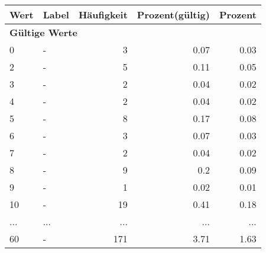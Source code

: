      \begin{longtable}{lXrrr}
     \toprule
     \textbf{Wert} & \textbf{Label} & \textbf{Häufigkeit} & \textbf{Prozent(gültig)} & \textbf{Prozent} \\
     \endhead
     \midrule
     \multicolumn{5}{l}{\textbf{Gültige Werte}}\\
        0 & \multicolumn{1}{X}{-} & %
          \num{3} &
          \num[round-mode=places,round-precision=2]{0,07} &
          \num[round-mode=places,round-precision=2]{0,03} \\
        2 & \multicolumn{1}{X}{-} & %
          \num{5} &
          \num[round-mode=places,round-precision=2]{0,11} &
          \num[round-mode=places,round-precision=2]{0,05} \\
        3 & \multicolumn{1}{X}{-} & %
          \num{2} &
          \num[round-mode=places,round-precision=2]{0,04} &
          \num[round-mode=places,round-precision=2]{0,02} \\
        4 & \multicolumn{1}{X}{-} & %
          \num{2} &
          \num[round-mode=places,round-precision=2]{0,04} &
          \num[round-mode=places,round-precision=2]{0,02} \\
        5 & \multicolumn{1}{X}{-} & %
          \num{8} &
          \num[round-mode=places,round-precision=2]{0,17} &
          \num[round-mode=places,round-precision=2]{0,08} \\
        6 & \multicolumn{1}{X}{-} & %
          \num{3} &
          \num[round-mode=places,round-precision=2]{0,07} &
          \num[round-mode=places,round-precision=2]{0,03} \\
        7 & \multicolumn{1}{X}{-} & %
          \num{2} &
          \num[round-mode=places,round-precision=2]{0,04} &
          \num[round-mode=places,round-precision=2]{0,02} \\
        8 & \multicolumn{1}{X}{-} & %
          \num{9} &
          \num[round-mode=places,round-precision=2]{0,2} &
          \num[round-mode=places,round-precision=2]{0,09} \\
        9 & \multicolumn{1}{X}{-} & %
          \num{1} &
          \num[round-mode=places,round-precision=2]{0,02} &
          \num[round-mode=places,round-precision=2]{0,01} \\
        10 & \multicolumn{1}{X}{-} & %
          \num{19} &
          \num[round-mode=places,round-precision=2]{0,41} &
          \num[round-mode=places,round-precision=2]{0,18} \\
       ... & ... & ... & ... & ... \\
        60 & \multicolumn{1}{X}{-} & %
          \num{171} &
          \num[round-mode=places,round-precision=2]{3,71} &
          \num[round-mode=places,round-precision=2]{1,63} \\


\end{longtable}

